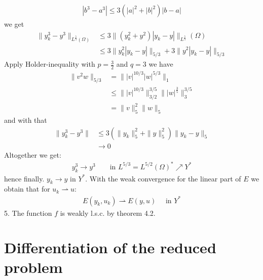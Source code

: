 \begin{example}
\begin{align*}
			|b^3 - a^3| \le 3(|a|^2 + |b|^2)|b - a|
		\end{align*}
		we get 
		\begin{align*}
			\|y_k^3 - y^3\|_{L^{\frac{5}{3}}(\Omega)} &\le 3 \|(y_k^2 + y^2)|y_k - y|\|_{L^{\frac{5}{3}}}(\Omega)\\
			&\le 3\|y_k^2|y_k - y|\|_{5\slash3} + 3 \|y^2 |y_k - y|\|_{5 \slash 3}
		\end{align*}
		Apply Holder-inequality with $p = \frac{3}{2}$ and $q = 3$ we have
		\begin{align*}
			\|v^2 w \|_{5 \slash 3} &= \| |v|^{10\slash 3} |w|^{5 \slash 3} \|_1 \\
			&\le \||v|^{10 \slash 3}\|^{3 \slash 5}_{3 \slash 2} \||w|^{\frac{3}{5}}\|_3^{3 \slash 5} \\
			&=  \|v\|^2_5 \|w\|_5
		\end{align*}
		and with that
		\begin{align*}
			\|y_k^3 - y^3\| &\le 3 (\|y_k\|^2_5 + \|y\|_5^2)\|y_k - y\|_5\\
			&\rightarrow 0
		\end{align*}
		Altogether we get:
		\begin{align*}
			y_k^3 \rightarrow y^3 \qquad \text{in } L^{5 \slash 3} = L^{5 \slash 2}(\Omega)^* \nearrow Y^*
		\end{align*}
		hence finally. $y_k \rightarrow y$ in $Y^*$. With the weak convergence for the linear part of $E$ we obtain that for $u_k \rightharpoonup u$:
		\begin{align*}
			E(y_k, u_k) \rightharpoonup E(y, u) \quad \text{ in } Y^*
		\end{align*}
		5. The function $f$ is weakly l.s.c. by theorem 4.2.
\end{example}


\newpage
\section{Differentiation of the reduced problem}
